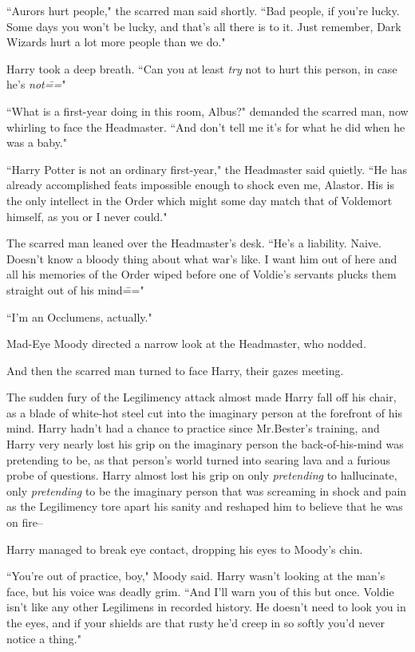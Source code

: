 ``Aurors hurt people," the scarred man said shortly. ``Bad people, if you're lucky. Some days you won't be lucky, and that's all there is to it. Just remember, Dark Wizards hurt a lot more people than we do."

Harry took a deep breath. ``Can you at least \emph{try} not to hurt this person, in case he's \emph{not\===}"

``What is a first-year doing in this room, Albus?" demanded the scarred man, now whirling to face the Headmaster. ``And don't tell me it's for what he did when he was a baby."

``Harry Potter is not an ordinary first-year," the Headmaster said quietly. ``He has already accomplished feats impossible enough to shock even me, Alastor. His is the only intellect in the Order which might some day match that of Voldemort himself, as you or I never could."

The scarred man leaned over the Headmaster's desk. ``He's a liability. Naive. Doesn't know a bloody thing about what war's like. I want him out of here and all his memories of the Order wiped before one of Voldie's servants plucks them straight out of his mind\==="

``I'm an Occlumens, actually."

Mad-Eye Moody directed a narrow look at the Headmaster, who nodded.

And then the scarred man turned to face Harry, their gazes meeting.

The sudden fury of the Legilimency attack almost made Harry fall off his chair, as a blade of white-hot steel cut into the imaginary person at the forefront of his mind. Harry hadn't had a chance to practice since Mr.\?Bester's training, and Harry very nearly lost his grip on the imaginary person the back-of-his-mind was pretending to be, as that person's world turned into searing lava and a furious probe of questions. Harry almost lost his grip on only \emph{pretending} to hallucinate, only \emph{pretending} to be the imaginary person that was screaming in shock and pain as the Legilimency tore apart his sanity and reshaped him to believe that he was on fire\---

Harry managed to break eye contact, dropping his eyes to Moody's chin.

``You're out of practice, boy," Moody said. Harry wasn't looking at the man's face, but his voice was deadly grim. ``And I'll warn you of this but once. Voldie isn't like any other Legilimens in recorded history. He doesn't need to look you in the eyes, and if your shields are that rusty he'd creep in so softly you'd never notice a thing."

